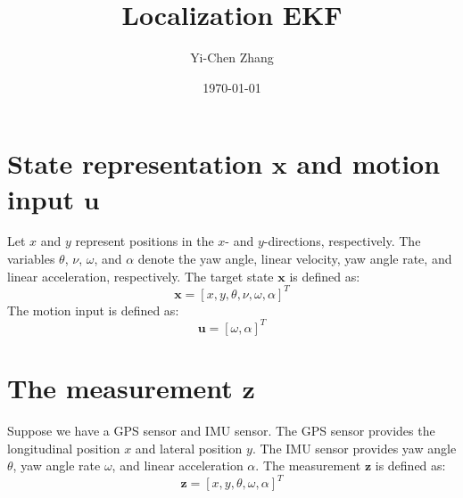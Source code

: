 \documentclass[12pt, a4paper]{article}
\title{Localization EKF}
\author{Yi-Chen Zhang}
\date{\today}
\begin{document}
\maketitle

\section{State representation $\bm{x}$ and motion input $\bm{u}$}
Let $x$ and $y$ represent positions in the $x$- and $y$-directions, respectively. The variables $\theta$, $\nu$, $\omega$, and $\alpha$ denote the yaw angle, linear velocity, yaw angle rate, and linear acceleration, respectively. The target state $\bm{x}$ is defined as:
\[
  \bm{x} = [x, y, \theta, \nu, \omega, \alpha]^{T}
\]
The motion input is defined as:
\[
  \bm{u} = [\omega, \alpha]^{T}
\]

\section{The measurement $\bm{z}$}
Suppose we have a GPS sensor and IMU sensor. The GPS sensor provides the longitudinal position $x$ and lateral position $y$. The IMU sensor provides yaw angle $\theta$, yaw angle rate $\omega$, and linear acceleration $\alpha$. The measurement $\bm{z}$ is defined as:
\[
  \bm{z} = [x, y, \theta, \omega, \alpha]^{T}
\]
\end{document}
